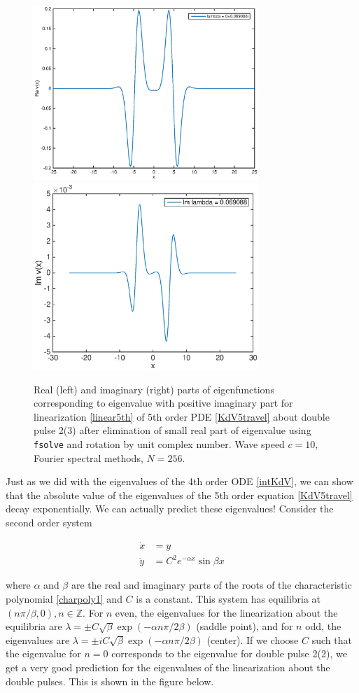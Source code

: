 \documentclass[12pt]{article}
\def\Z{{\mathbb Z}}
\begin{document}
\begin{figure}[H]
	\includegraphics[width=8.5cm]{four10dp2eigenfnsreal_after}
	\includegraphics[width=8.5cm]{four10dp2eigenfnsimag_after}
	\caption{Real (left) and imaginary (right) parts of eigenfunctions corresponding to eigenvalue with positive imaginary part for linearization \eqref{linear5th} of 5th order PDE \eqref{KdV5travel} about double pulse 2(3) after elimination of small real part of eigenvalue using \texttt{fsolve} and rotation by unit complex number. Wave speed $c = 10$, Fourier spectral methods, $N = 256$.}
\end{figure}

Just as we did with the eigenvalues of the 4th order ODE \eqref{intKdV}, we can show that the absolute value of the eigenvalues of the 5th order equation \eqref{KdV5travel} decay exponentially. We can actually predict these eigenvalues! Consider the second order system

\begin{align}\label{simplesystem}
\dot{x} &= y \\
\dot{y} &= C^2 e^{-\alpha x} \sin{\beta x}
\end{align}

where $\alpha$ and $\beta$ are the real and imaginary parts of the roots of the characteristic polynomial \eqref{charpoly1} and $C$ is a constant. This system has equilibria at $(n \pi / \beta, 0), n \in \Z$. For $n$ even, the eigenvalues for the linearization about the equilibria are $\lambda = \pm C \sqrt{\beta}\exp{(-\alpha n \pi / 2 \beta)}$ (saddle point), and for $n$ odd, the eigenvalues are $\lambda = \pm i C \sqrt{\beta}\exp{(-\alpha n \pi / 2 \beta)}$ (center). If we choose $C$ such that the eigenvalue for $n = 0$ corresponds to the eigenvalue for double pulse 2(2), we get a very good prediction for the eigenvalues of the linearization about the double pulses. This is shown in the figure below.
\end{document}
